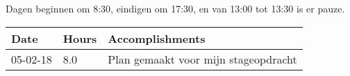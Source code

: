 Dagen beginnen om 8:30, eindigen om 17:30, en van 13:00 tot 13:30 is er pauze.
\begin{center}
    \begin{tabular}{ | l | l | p{9cm} |}
    \hline

    Date & Hours & Accomplishments \\ \hline
    05-02-18 & 8.0 & Plan gemaakt voor mijn stageopdracht \\ \hline

    \hline
    \end{tabular}
\end{center}
